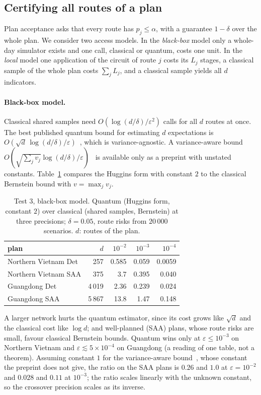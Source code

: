\documentclass[pdflatex,sn-mathphys-num]{sn-jnl}
\theoremstyle{thmstyleone}
\theoremstyle{thmstyletwo}
\begin{document}
\subsection{Certifying all routes of a plan}\label{sec:cert}
Plan acceptance asks that every route has $p_j\le\alpha$, with a guarantee $1-\delta$ over the whole plan. We consider two access models. In the \emph{black-box} model only a whole-day simulator exists and one call, classical or quantum, costs one unit. In the \emph{local} model one application of the circuit of route $j$ costs its $L_j$ stages, a classical sample of the whole plan costs $\sum_jL_j$, and a classical sample yields all $d$ indicators.

\paragraph{Black-box model.} Classical shared samples need $O(\log(d/\delta)/\varepsilon^2)$ calls for all $d$ routes at once. The best published quantum bound for estimating $d$ expectations is $O(\sqrt d\,\log(d/\delta)/\varepsilon)$~\cite{Huggins2022}, which is variance-agnostic. A variance-aware bound $O(\sqrt{\sum_jv_j}\log(d/\delta)/\varepsilon)$~\cite{Tang2025} is available only as a preprint with unstated constants. Table~\ref{tab:blackbox} compares the Huggins form with constant $2$ to the classical Bernstein bound with $v=\max_jv_j$.

\begin{table}[t]
\caption{Test 3, black-box model. Quantum (Huggins form, constant $2$) over classical (shared samples, Bernstein) at three precisions; $\delta=0.05$, route risks from $20\,000$ scenarios. $d$: routes of the plan.}\label{tab:blackbox}
\begin{tabular}{@{}lrrrr@{}}
\toprule
plan & $d$ & $10^{-2}$ & $10^{-3}$ & $10^{-4}$ \\
\midrule
Northern Vietnam Det & 257 & 0.585 & 0.059 & 0.0059 \\
Northern Vietnam SAA & 375 & 3.7 & 0.395 & 0.040 \\
Guangdong Det & 4\,019 & 2.36 & 0.239 & 0.024 \\
Guangdong SAA & 5\,867 & 13.8 & 1.47 & 0.148 \\
\bottomrule
\end{tabular}
\end{table}

A larger network hurts the quantum estimator, since its cost grows like $\sqrt d$ and the classical cost like $\log d$; and well-planned (SAA) plans, whose route risks are small, favour classical Bernstein bounds. Quantum wins only at $\varepsilon\le10^{-3}$ on Northern Vietnam and $\varepsilon\lesssim5\times10^{-4}$ on Guangdong (a reading of one table, not a theorem). Assuming constant $1$ for the variance-aware bound~\cite{Tang2025}, whose constant the preprint does not give, the ratio on the SAA plans is $0.26$ and $1.0$ at $\varepsilon=10^{-2}$ and $0.028$ and $0.11$ at $10^{-3}$; the ratio scales linearly with the unknown constant, so the crossover precision scales as its inverse.
\end{document}
